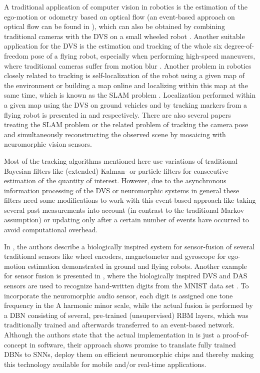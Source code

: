 A traditional application of computer vision in robotics is the estimation of the ego-motion or odometry based on optical flow (an event-based approach on optical flow can be found in \cite{Benosman2014}), which can also be obtained by combining traditional cameras with the \ac{DVS} on a small wheeled robot \cite{Censi2014}.
Another suitable application for the \ac{DVS} is the estimation and tracking of the whole six degree-of-freedom pose of a flying robot, especially when performing high-speed maneuvers, where traditional cameras suffer from motion blur \cite{Mueggler2014}.
Another problem in robotics closely related to tracking is self-localization of the robot using a given map of the environment or building a map online and localizing within this map at the same time, which is known as the \ac{SLAM} problem \cite{Thrun2005}.
Localization performed within a given map using the \ac{DVS} on ground vehicles and by tracking markers from a flying robot is presented in \cite{Gallego2015} and \cite{Censi2013} respectively.
There are also several papers treating the \ac{SLAM} problem \cite{Weikersdorfer2012, Weikersdorfer2014} or the related problem of tracking the camera pose and simultaneously reconstructing the observed scene by mosaicing \cite{Kim2014} with neuromorphic vision sensors.

Most of the tracking algorithms mentioned here use variations of traditional Bayesian filters like (extended) Kalman- or particle-filters \cite{Thrun2005} for consecutive estimation of the quantity of interest.
However, due to the asynchronous information processing of the \ac{DVS} or neuromorphic systems in general these filters need some modifications to work with this event-based approach \cite{Weikersdorfer2013} like taking several past measurements into account (in contrast to the traditional Markov assumption) or updating only after a certain number of events have occurred to avoid computational overhead.

In \cite{Axenie2015}, the authors describe a biologically inspired system for sensor-fusion of several traditional sensors like wheel encoders, magnetometer and gyroscope for ego-motion estimation demonstrated in ground and flying robots.
Another example for sensor fusion is presented in \cite{OConnor2013}, where the biologically inspired \ac{DVS} and \ac{DAS} sensors are used to recognize hand-written digits from the \ac{MNIST} data set \cite{LeCun1998}.
To incorporate the neuromorphic audio sensor, each digit is assigned one tone frequency in the A harmonic minor scale, while the actual fusion is performed by a \ac{DBN} consisting of several, pre-trained (unsupervised) \ac{RBM} layers, which was traditionally trained and afterwards transferred to an event-based network.
Although the authors state that the actual implementation in \cite{OConnor2013} is just a proof-of-concept in software, their approach shows promise to translate fully trained \acp{DBN} to \acp{SNN}, deploy them on efficient neuromorphic chips and thereby making this technology available for mobile and/or real-time applications.

